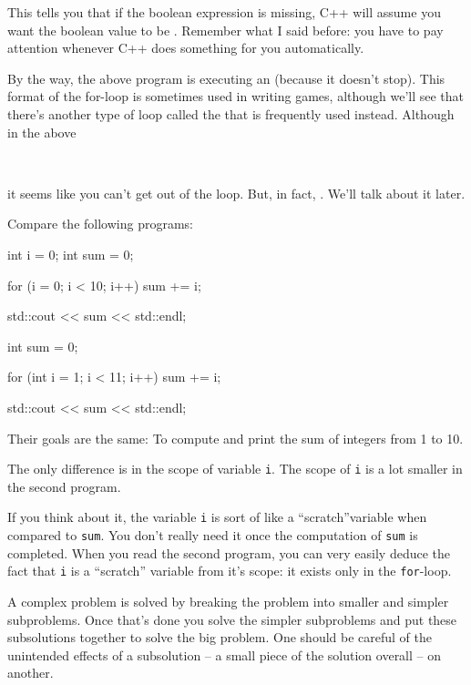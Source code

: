 This tells you that if the boolean expression is missing, C++ will
assume you want the boolean value to be . Remember
what I said before: you have to pay attention whenever C++ does
something for you automatically.

By the way, the above program is executing an 
(because it doesn't stop). This format of the for-loop is sometimes used in writing games, although we'll see that there's another type of loop called the
 that is frequently used instead. Although in the above

\\

it seems like you can't get out of the loop. But, in fact, . We'll talk
about it later.

\newpage{}

Compare the following programs:
\begin{console}
int i = 0;
int sum = 0;

for (i = 0; i < 10; i++)
{   
    sum += i;
}

std::cout << sum << std::endl;
\end{console}

\begin{console}
int sum = 0;

for (int i = 1; i < 11; i++)
{   
    sum += i;
}

std::cout << sum << std::endl;
\end{console}

Their goals are the same: To compute and print the sum of integers from
1 to 10.

The only difference is in the scope of variable \texttt{i}. The scope of
\texttt{i} is a lot smaller in the second program.

If you think about it, the variable \texttt{i} is sort of like a
``scratch''variable when compared to \texttt{sum}. You
don't really need it once the computation of \texttt{sum}
is completed. When you read the second program, you can very easily
deduce the fact that \texttt{i} is a ``scratch'' variable from
it's scope: it exists only in the \texttt{for}-loop.

A complex problem is solved by breaking the problem into smaller and
simpler subproblems. Once that's done you solve the
simpler subproblems and put these subsolutions together to solve the big
problem. One should be careful of the unintended effects of a
subsolution -- a small piece of the solution overall -- on another.

